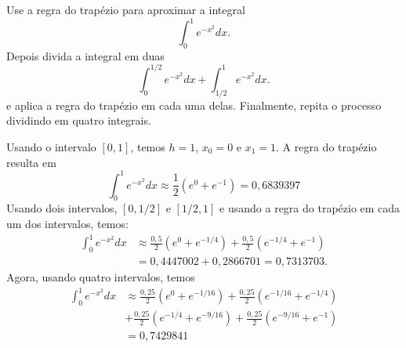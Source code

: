 \begin{ex}
Use a regra do trapézio para aproximar a integral
$$
\int_0^1e^{-x^2}dx.
$$
Depois divida a integral em duas
$$
\int_0^{1/2}e^{-x^2}dx+\int_{1/2}^{1}e^{-x^2}dx.
$$
e aplica a regra do trapézio em cada uma delas. Finalmente, repita o processo dividindo em quatro integrais.
\end{ex}
Usando o intervalo $[0,1]$, temos $h=1$, $x_0=0$ e $x_1=1$. A regra do trapézio resulta em
$$
\int_0^1e^{-x^2}dx\approx \frac{1}{2}(e^{0}+e^{-1})=0,6839397
$$
Usando dois intervalos, $[0,1/2]$ e $[1/2,1]$ e usando a regra do trapézio em cada um dos intervalos, temos:
\begin{align*}
\int_0^1e^{-x^2}dx &\approx \frac{0,5}{2}\left(e^{0}+e^{-1/4}\right) + \frac{0,5}{2}\left(e^{-1/4}+e^{-1}\right) \\
&= 0,4447002+0,2866701 =0,7313703.
\end{align*}
Agora, usando quatro intervalos, temos
\begin{align*}
\int_0^1e^{-x^2}dx &\approx \frac{0,25}{2}\left(e^{0}+e^{-1/16}\right) + \frac{0,25}{2}\left(e^{-1/16}+e^{-1/4}\right) \\
&+ \frac{0,25}{2}\left(e^{-1/4}+e^{-9/16}\right)+\frac{0,25}{2}\left(e^{-9/16}+e^{-1}\right) \\
&= 0,7429841
\end{align*}


